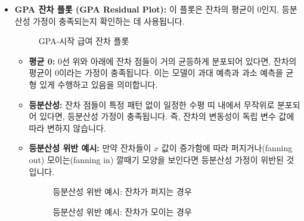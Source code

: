 \documentclass[11pt,a4paper]{book}
\theoremstyle{definition}
\begin{document}
\begin{itemize}
    \item \textbf{GPA 잔차 플롯 (GPA Residual Plot):}
    이 플롯은 잔차의 평균이 0인지, 등분산성 가정이 충족되는지 확인하는 데 사용됩니다.
    \begin{figure}[h!]
        \centering
        \caption{GPA-시작 급여 잔차 플롯}
        \label{fig:gpa_salary_residual_plot}
    \end{figure}
    \begin{tcolorbox}[colback=lightblue,colframe=darkblue,title={평균 0 및 등분산성 가정 확인}]
    \begin{itemize}
        \item \textbf{평균 0:} 0선 위와 아래에 잔차 점들이 거의 균등하게 분포되어 있다면, 잔차의 평균이 0이라는 가정이 충족됩니다. 이는 모델이 과대 예측과 과소 예측을 균형 있게 수행하고 있음을 의미합니다.
        \item \textbf{등분산성:} 잔차 점들이 특정 패턴 없이 일정한 수평 띠 내에서 무작위로 분포되어 있다면, 등분산성 가정이 충족됩니다. 즉, 잔차의 변동성이 독립 변수 값에 따라 변하지 않습니다.
        \item \textbf{등분산성 위반 예시:} 만약 잔차들이 $x$ 값이 증가함에 따라 퍼지거나(fanning out) 모이는(fanning in) 깔때기 모양을 보인다면 등분산성 가정이 위반된 것입니다.
        \begin{figure}[h!]
            \centering
            \caption{등분산성 위반 예시: 잔차가 퍼지는 경우}
            \label{fig:residual_fanning_out}
        \end{figure}
        \begin{figure}[h!]
            \centering
            \caption{등분산성 위반 예시: 잔차가 모이는 경우}
            \label{fig:residual_fanning_in}
        \end{figure}
    \end{itemize}
    \end{tcolorbox}


\end{itemize}
\end{document}
